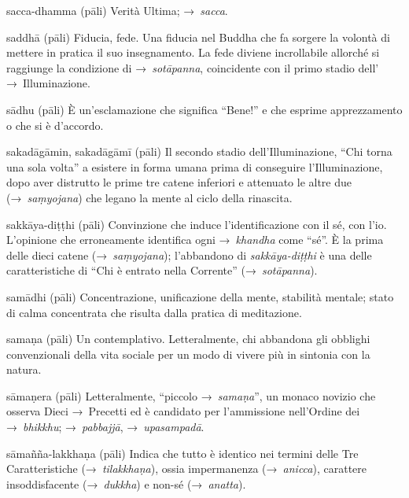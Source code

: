 \begin{glossarydescription}
\item[sacca-dhamma] (pāli) Verità Ultima; →~\emph{sacca}.

\item[saddhā] (pāli) Fiducia, fede. Una fiducia nel Buddha che fa sorgere la
  volontà di mettere in pratica il suo insegnamento. La fede diviene
  incrollabile allorché si raggiunge la condizione di →~\emph{sotāpanna},
  coincidente con il primo stadio dell' →~Illuminazione.

\item[sādhu] (pāli) È un'esclamazione che significa ``Bene!'' e che esprime
  apprezzamento o che si è d'accordo.

\item[sakadāgāmin, sakadāgāmī] (pāli) Il secondo stadio dell'Illuminazione,
  ``Chi torna una sola volta'' a esistere in forma umana prima di conseguire
  l'Illuminazione, dopo aver distrutto le prime tre catene inferiori e attenuato
  le altre due (→~\emph{saṃyojana}) che legano la mente al ciclo della
  rinascita.

\item[sakkāya-diṭṭhi] (pāli) Convinzione che induce l'identificazione con il sé,
  con l'io. L'opinione che erroneamente identifica ogni →~\emph{khandha} come
  ``sé''. È la prima delle dieci catene (→~\emph{saṃyojana}); l'abbandono di
  \emph{sakkāya-diṭṭhi} è una delle caratteristiche di ``Chi è entrato nella
  Corrente'' (→~\emph{sotāpanna}).

\item[samādhi] (pāli) Concentrazione, unificazione della mente, stabilità
  mentale; stato di calma concentrata che risulta dalla pratica di meditazione.

\item[samaṇa] (pāli) Un contemplativo. Letteralmente, chi abbandona gli obblighi
  convenzionali della vita sociale per un modo di vivere più in sintonia con la
  natura.

\item[sāmaṇera] (pāli) Letteralmente, ``piccolo →~\emph{samaṇa}'', un monaco
  novizio che osserva Dieci →~Precetti ed è candidato per l'ammissione
  nell'Ordine dei →~\emph{bhikkhu}; →~\emph{pabbajjā}, →~\emph{upasampadā}.

\item[sāmañña-lakkhaṇa] (pāli) Indica che tutto è identico nei termini delle Tre
  Caratteristiche (→~\emph{tilakkhaṇa}), ossia impermanenza (→~\emph{anicca}),
  carattere insoddisfacente (→~\emph{dukkha}) e non-sé (→~\emph{anatta}).


\end{glossarydescription}
